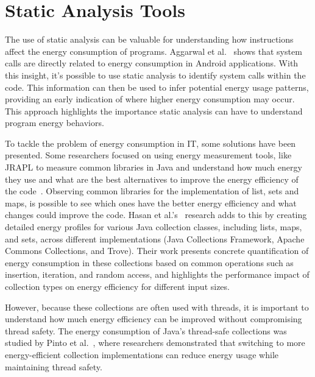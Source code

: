 \section{Static Analysis Tools}

The use of static analysis can be valuable for understanding how instructions affect the energy consumption of programs. Aggarwal et al.~\cite{aggarwal2014power} shows that system calls are directly related to energy consumption in Android applications. With this insight, it's possible to use static analysis to identify system calls within the code. This information can then be used to infer potential energy usage patterns, providing an early indication of where higher energy consumption may occur. This approach highlights the importance static analysis can have to understand program energy behaviors.

To tackle the problem of energy consumption in IT, some solutions have been presented. Some researchers focused on using energy measurement tools, like JRAPL to measure common libraries in Java and understand how much energy they use and what are the best alternatives to improve the energy efficiency of the code~\cite{10.1145/2896967.2896968}. Observing common libraries for the implementation of list, sets and maps, is possible to see which ones have the better energy efficiency and what changes could improve the code.
Hasan et al.'s~\cite{10.1145/2884781.2884869} research adds to this by creating detailed energy profiles for various Java collection classes, including lists, maps, and sets, across different implementations (Java Collections Framework, Apache Commons Collections, and Trove). Their work presents concrete quantification of energy consumption in these collections based on common operations such as insertion, iteration, and random access, and highlights the performance impact of collection types on energy efficiency for different input sizes.

However, because these collections are often used with threads, it is important to understand how much energy efficiency can be improved without compromising thread safety. The energy consumption of Java's thread-safe collections was studied by Pinto et al.~\cite{7816451}, where researchers demonstrated that switching to more energy-efficient collection implementations can reduce energy usage while maintaining thread safety.

